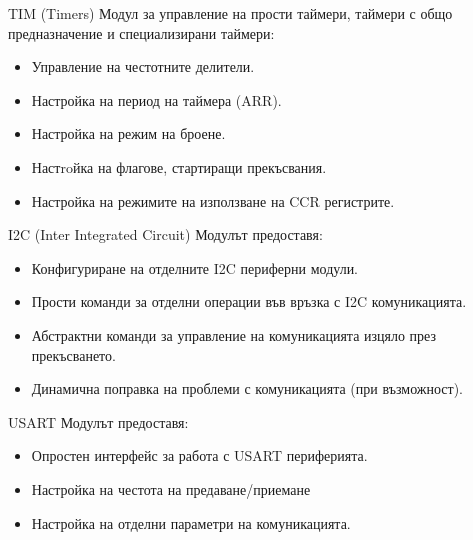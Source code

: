 \documentclass{beamer}
\begin{document}
\begin{frame}[t]
	\pause
	\begin{block}{TIM (Timers)}
		\pause
		Модул за управление на прости таймери, таймери с общо предназначение и специализирани таймери:
		\begin{itemize}
			\pause
			\item Управление на честотните делители.
			\pause
			\item Настройка на период на таймера (ARR).
			\pause
			\item Настройка на режим на броене.
			\pause
			\item Настroйка на флагове, стартиращи прекъсвания.
			\pause
			\item Настройка на режимите на използване на CCR регистрите.
		\end{itemize}
	\end{block}

\end{frame}

\begin{frame}[t]
	\pause
	\begin{block}{I2C (Inter Integrated Circuit)}
		\pause
		Модулът предоставя:
		\begin{itemize}
			\pause
			\item Конфигуриране на отделните I2C периферни модули.
			\pause
			\item Прости команди за отделни операции във връзка с I2C комуникацията.
			\pause
			\item Абстрактни команди за управление на комуникацията изцяло през прекъсването.
			\pause
			\item Динамична поправка на проблеми с комуникацията (при възможност).
		\end{itemize} 
	\end{block}

\end{frame}

\begin{frame}[t]
	\pause
	\begin{block}{USART}
		\pause
		Модулът предоставя:
		\begin{itemize}
			\pause
			\item Опростен интерфейс за работа с USART периферията.
			\pause
			\item Настройка на честота на предаване/приемане
			\pause
			\item Настройка на отделни параметри на комуникацията.
		\end{itemize} 
	\end{block}

\end{frame}
\end{document}
